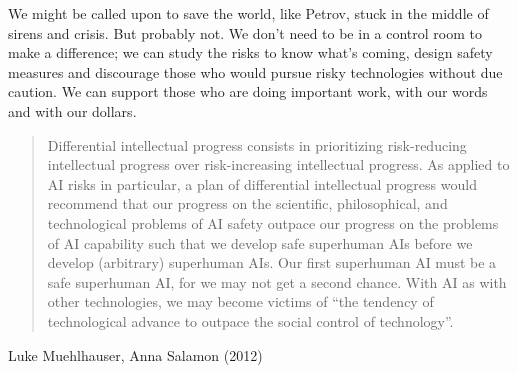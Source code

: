 \documentclass{article}
\begin{document}
We might be called upon to save the world, like Petrov, stuck in the middle of
sirens and crisis. But probably not. We don't need to be in a control room to
make a difference; we can study the risks to know what's coming, design safety
measures and discourage those who would pursue risky technologies without due
caution. We can support those who are doing important work, with our words and
with our dollars.

\divider

\blockquote{Differential intellectual progress consists in prioritizing risk-reducing
intellectual progress over risk-increasing intellectual progress. As applied to
AI risks in particular, a plan of differential intellectual progress would
recommend that our progress on the scientific, philosophical, and technological
problems of AI safety outpace our progress on the problems of AI capability
such that we develop safe superhuman AIs before we develop (arbitrary)
superhuman AIs. Our first superhuman AI must be a safe superhuman AI, for we
may not get a second chance. With AI as with other technologies, we may become
victims of ``the tendency of technological advance to outpace the social control
of technology''.}{Luke Muehlhauser, Anna Salamon (2012)}



\end{document}
